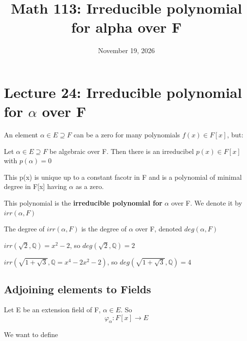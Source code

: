 \documentclass[main.tex]{subfiles}
\title{Math 113: Irreducible polynomial for alpha over F}
\author{\defaultauthor}
\date{November 19, 2026}
\begin{document}
\ifSubfilesClassLoaded{\maketitle}{}

\section{Lecture 24: Irreducible polynomial for \texorpdfstring{$\alpha$}{α} over F}

An element $\alpha \in E  \supseteq F$ can be a zero for many polynomials $f(x) \in F[x]$, but: 

\begin{theorem}
    Let $\alpha \in E \supseteq F$ be algebraic over F. Then there is an irreducibel $p(x) \in F[x]$ with $p(\alpha) = 0$

    This p(x) is unique up to a constant facotr in F and is a polynomial of minimal degree in F[x] having $\alpha$ as a zero. 
\end{theorem}
\begin{definition}
    This polynomial is the \textbf{irreducible polynomial for } $\alpha$ over F. We denote it by $irr(\alpha,F)$

    The degree of $irr(\alpha,F)$ is the degree of $\alpha$ over F, denoted $deg(\alpha,F)$
\end{definition}
\begin{example}
    $irr(\sqrt{2},\mathbb{Q})=x^2 - 2$, so $deg(\sqrt{2}, \mathbb{Q}) = 2 $
\end{example}
\begin{example}
    $irr(\sqrt{1+\sqrt{3}}, \mathbb{Q} = x^4 - 2x^2-2)$, so $deg(\sqrt{1+\sqrt{3}},\mathbb{Q})=4$
\end{example}
\subsection{Adjoining elements to Fields}
Let E be an extension field of F, $\alpha \in E$. So 
$$\varphi_{\alpha}: F[x] \to E$$ 

We want to define 
\end{document}
